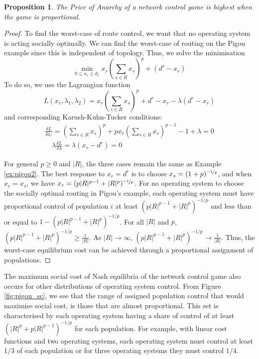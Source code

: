 \documentclass{article}
\newtheorem{prop}{Proposition}
\begin{document}
    \begin{prop} \label{prop:poa_worstcase}
    The Price of Anarchy of a network control game is highest when the game is proportional. 
    \end{prop}
    \begin{proof}
    To find the worst-case of route control, we want that no operating system is acting socially optimally. We can find the worst-case of routing on the Pigou example since this is independent of topology. Thus, we solve the minimisation
         \[  \min_{0 \leq x_r \leq d_r} x_r(\sum_{s \in R}x_s)^p +  (d^r-x_r) \]
   To do so, we use the Lagrangian function
		 \[ L(x_r,\lambda_1,\lambda_2)=x_r(\sum_{s \in R}x_s)^p + d^r-x_r-\lambda(d^r-x_r) \]
    and corresponding Karush-Kuhn-Tucker conditions:
		 \begin{align*}
		     \frac{\delta L}{\delta x_r}= (\sum_{s \in R}x_s)^p+px_r(\sum_{s \in R}x_s)^{p-1}-1+\lambda=0 \\
		     \quad  \lambda \frac{\delta L}{\delta \lambda}= \lambda(x_r-d^r) = 0 
		 \end{align*}
		
    For general $p\geq 0$ and $|R|$, the three cases remain the same as Example \ref{ex:pigou2}. The best response to $x_r=d^r$ is to choose $x_s= (1+p)^{\nicefrac{-1}{p}}$, and when $x_r=x_s$, we have $x_r=(p|R|^{p-1}+|R|^p)^{\nicefrac{-1}{p}}$.
    For no operating system to choose the socially optimal routing in Pigou's example, each operating system must have proportional control of population $i$ at least $(p|R|^{p-1}+|R|^p)^{-1/p}$ and less than or equal to $1-(p|R|^{p-1}+|R|^p)^{-1/p}$. For all $|R|$ and $p$, $(p|R|^{p-1}+|R|^p)^{-1/p} \geq \frac{1}{|R|}$. As $|R| \rightarrow \infty$, $(p|R|^{p-1}+|R|^p)^{-1/p} \rightarrow \frac{1}{|R|}$.  Thus, the worst-case equilibrium cost can be achieved through a proportional assignment of populations.
    \end{proof}
    
    The maximum social cost of Nash equilibria of the network control game also occurs for other distributions of operating system control. From Figure \ref{fig:pigou_sc}, we see that the range of assigned population control that would maximise social cost, is those that are almost proportional. This set is characterised by each operating system having a share of control of at least $(|R|^p+p|R|^{p-1})^{-1/p}$ for each population. For example, with linear cost functions and two operating systems, each operating system must control at least $1/3$ of each population or for three operating systems they must control $1/4$. 
    
\end{document}
